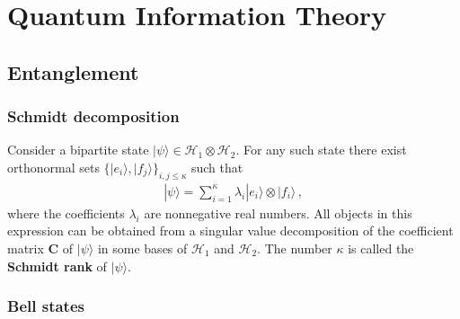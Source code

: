 \chapter{Quantum Information Theory}\label{chapter:quantum_computing}

    \minitoc

\section{Entanglement}
\subsection{Schmidt decomposition}

    \begin{construct}
        Consider a bipartite state $|\psi\rangle\in\mathcal{H}_1\otimes\mathcal{H}_2$. For any such state there exist orthonormal sets $\bigl\{|e_i\rangle,|f_j\rangle\bigr\}_{i,j\leq\kappa}$ such that
        \begin{gather}
            |\psi\rangle = \sum_{i=1}^\kappa\lambda_i|e_i\rangle\otimes|f_i\rangle\,,
        \end{gather}
        where the coefficients $\lambda_i$ are nonnegative real numbers. All objects in this expression can be obtained from a singular value decomposition of the coefficient matrix $\mathbf{C}$ of $|\psi\rangle$ in some bases of $\mathcal{H}_1$ and $\mathcal{H}_2$. The number $\kappa$ is called the \textbf{Schmidt rank} of $|\psi\rangle$.
    \end{construct}


\subsection{Bell states}

